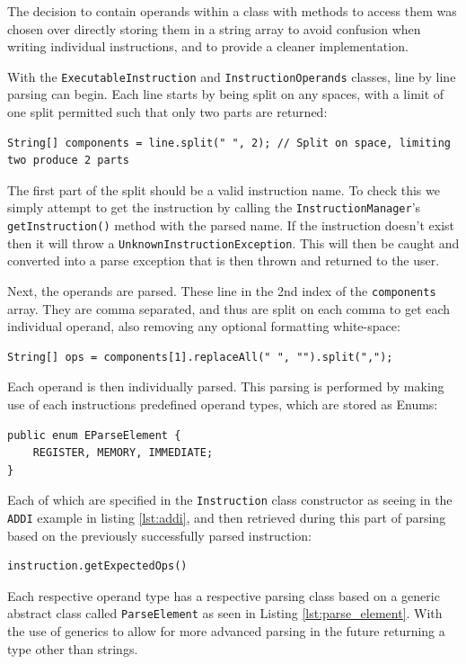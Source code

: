 The decision to contain operands within a class with methods to access them was chosen over directly storing them in a string array to avoid confusion when writing individual instructions, and to provide a cleaner implementation.

With the \texttt{ExecutableInstruction} and \texttt{InstructionOperands} classes, line by line parsing can begin. Each line starts by being split on any spaces, with a limit of one split permitted such that only two parts are returned:

\begin{lstlisting}
String[] components = line.split(" ", 2); // Split on space, limiting two produce 2 parts
\end{lstlisting}

The first part of the split should be a valid instruction name. To check this we simply attempt to get the instruction by calling the \texttt{InstructionManager}'s \verb|getInstruction()| method with the parsed name. If the instruction doesn't exist then it will throw a \texttt{UnknownInstructionException}. This will then be caught and converted into a parse exception that is then thrown and returned to the user.

Next, the operands are parsed. These line in the 2nd index of the \verb|components| array. They are comma separated, and thus are split on each comma to get each individual operand, also removing any optional formatting white-space:
\begin{lstlisting}
String[] ops = components[1].replaceAll(" ", "").split(",");
\end{lstlisting}

Each operand is then individually parsed. This parsing is performed by making use of each instructions predefined operand types, which are stored as Enums:

\begin{lstlisting}
public enum EParseElement {
    REGISTER, MEMORY, IMMEDIATE;
}
\end{lstlisting}

Each of which are specified in the \texttt{Instruction} class constructor as seeing in the \texttt{ADDI} example in listing \ref{lst:addi}, and then retrieved during this part of parsing based on the previously successfully parsed instruction:
\begin{lstlisting}
instruction.getExpectedOps()
\end{lstlisting}

Each respective operand type has a respective parsing class based on a generic abstract class called \texttt{ParseElement} as seen in Listing \ref{lst:parse_element}. With the use of generics to allow for more advanced parsing in the future returning a type other than strings.

